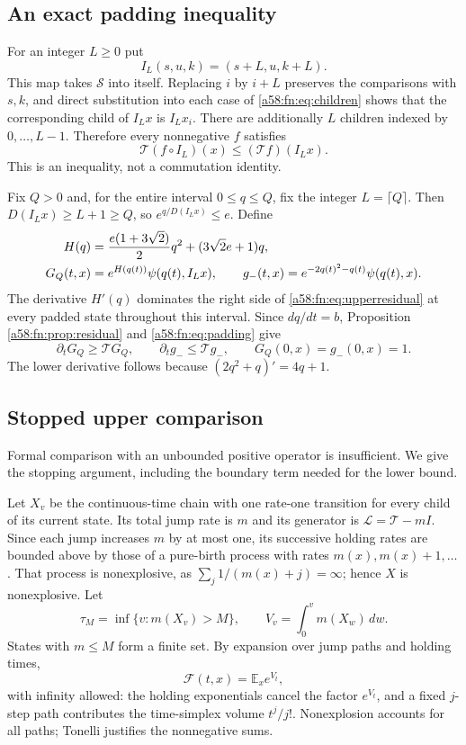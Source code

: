 \documentclass[11pt,letterpaper]{article}
\theoremstyle{remark}
\newcommand{\TT}{\mathcal T}
\newcommand{\FF}{\mathcal F}
\newcommand{\E}{\mathbb E}
\newcommand{\calS}{\mathcal S}
\begin{document}
\subsection{An exact padding inequality}
For an integer $L\ge0$ put
\[
 I_L(s,u,k)=(s+L,u,k+L).
\]
This map takes $\calS$ into itself. Replacing $i$ by $i+L$ preserves the comparisons with $s,k$, and direct substitution into each case of \eqref{a58:fn:eq:children} shows that the corresponding child of $I_Lx$ is $I_Lx_i$. There are additionally $L$ children indexed by $0,\ldots,L-1$. Therefore every nonnegative $f$ satisfies
\begin{equation}\label{a58:fn:eq:padding}
 \TT(f\circ I_L)(x)\le(\TT f)(I_Lx).
\end{equation}
This is an inequality, not a commutation identity.

Fix $Q>0$ and, for the entire interval $0\le q\le Q$, fix the integer $L=\lceil Q\rceil$. Then $D(I_Lx)\ge L+1\ge Q$, so $e^{q/D(I_Lx)}\le e$. Define
\begin{align}\label{a58:fn:eq:barriers}
 H(q)&=\frac{e(1+3\sqrt2)}2q^2+(3\sqrt2e+1)q,\notag\\
 G_Q(t,x)&=e^{H(q(t))}\psi(q(t),I_Lx),\qquad
 g_-(t,x)=e^{-2q(t)^2-q(t)}\psi(q(t),x).
\end{align}
The derivative $H'(q)$ dominates the right side of \eqref{a58:fn:eq:upperresidual} at every padded state throughout this interval. Since $dq/dt=b$, Proposition \ref{a58:fn:prop:residual} and \eqref{a58:fn:eq:padding} give
\begin{equation}\label{a58:fn:eq:diffbarriers}
 \partial_tG_Q\ge\TT G_Q,\qquad
 \partial_tg_-\le\TT g_-,\qquad G_Q(0,x)=g_-(0,x)=1.
\end{equation}
The lower derivative follows because $(2q^2+q)'=4q+1$.

\subsection{Stopped upper comparison}
Formal comparison with an unbounded positive operator is insufficient. We give the stopping argument, including the boundary term needed for the lower bound.

Let $X_v$ be the continuous-time chain with one rate-one transition for every child of its current state. Its total jump rate is $m$ and its generator is $\mathcal L=\TT-mI$. Since each jump increases $m$ by at most one, its successive holding rates are bounded above by those of a pure-birth process with rates $m(x),m(x)+1,\ldots$. That process is nonexplosive, as $\sum_j1/(m(x)+j)=\infty$; hence $X$ is nonexplosive. Let
\[
 \tau_M=\inf\{v:m(X_v)>M\},\qquad
 V_v=\int_0^v m(X_w)\,dw.
\]
States with $m\le M$ form a finite set. By expansion over jump paths and holding times,
\begin{equation}\label{a58:fn:eq:FK}
 \FF(t,x)=\E_x e^{V_t},
\end{equation}
with infinity allowed: the holding exponentials cancel the factor $e^{V_t}$, and a fixed $j$-step path contributes the time-simplex volume $t^j/j!$. Nonexplosion accounts for all paths; Tonelli justifies the nonnegative sums.
\end{document}
